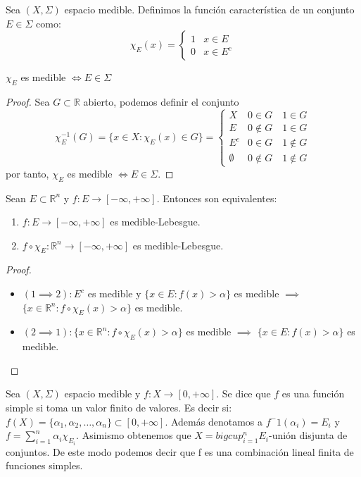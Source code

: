 \label{Función característica}
\begin{definición}
Sea $(X, \Sigma)$ espacio medible. Definimos la función característica de un conjunto $E \in \Sigma$ como: \[\chi_E(x) = \begin{cases} 1 & x \in E \\ 0 & x \in E^c \end{cases}\]
\end{definición}
\begin{observación}
$\chi_E$ es medible $\iff E \in \Sigma$
\end{observación}
\begin{proof}
    Sea $G \subset \mathbb{R}$ abierto, podemos definir el conjunto $$\chi_E^{-1}(G) = \{x \in X : \chi_E(x) \in G\} = \begin{cases} X & 0 \in G \quad 1\in G \\ E & 0 \not\in G \quad 1 \in G \\ E^c & 0 \in G \quad 1 \not\in G \\ \emptyset & 0 \not\in G \quad 1 \not\in G\end{cases}$$
    por tanto, $\chi_E$ es medible $\iff E \in \Sigma$.
\end{proof}
\begin{observación}
Sean $E \subset \mathbb{R}^{n}$ y $f: E \to [-\infty, +\infty]$. Entonces son equivalentes:
\begin{enumerate}
    \item $f: E \to [-\infty, +\infty]$ es medible-Lebesgue.
    \item $f \circ \chi_E: \mathbb{R}^n \to [-\infty, +\infty]$ es medible-Lebesgue.
\end{enumerate}
\end{observación}
\begin{proof}
    \leavevmode
    \begin{itemize}
        \item $(1 \implies 2): E^c$ es medible y $\{x \in E : f(x) > \alpha\}$ es medible $\implies$ $\{x \in \mathbb{R}^n : f \circ \chi_E(x) > \alpha\}$ es medible.
        \item $(2 \implies 1): \{x \in \mathbb{R}^n : f \circ \chi_E(x) > \alpha\}$ es medible $\implies$ $\{x \in E : f(x) > \alpha\}$ es medible.
    \end{itemize}
\end{proof}
\begin{definición}
Sea $(X, \Sigma)$ espacio medible y $f: X \to [0, +\infty]$. Se dice que $f$ es una función simple si toma un valor finito de valores. Es decir si:
$f(X) = \{\alpha_1, \alpha_2, \dots, \alpha_n\} \subset [0, +\infty]$.
Además denotamos a $f^-1(\alpha_i) = E_i$ y $f = \sum_{i = 1}^{n}\alpha_i\chi_{E_i}$. Asimismo obtenemos que $X = bigcup_{i = 1}^{n}E_i$-unión disjunta de conjuntos.
De este modo podemos decir que f es una combinación lineal finita de funciones simples.
\end{definición}
